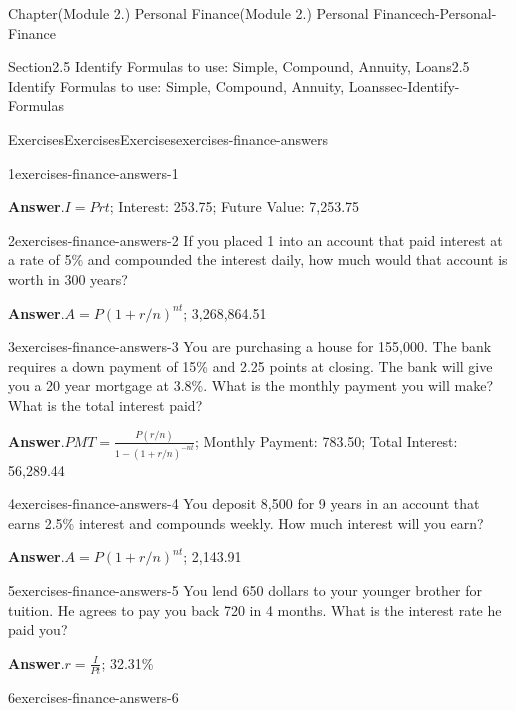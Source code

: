 \documentclass[oneside,10pt,]{book}
\newcommand{\blocktitlefont}{\relax}
\begin{document}
\begin{chapterptx}{Chapter}{(Module 2.) Personal Finance}{}{(Module 2.) Personal Finance}{}{}{ch-Personal-Finance}
\begin{sectionptx}{Section}{2.5 Identify Formulas to use: Simple, Compound, Annuity, Loans}{}{2.5 Identify Formulas to use: Simple, Compound, Annuity, Loans}{}{}{sec-Identify-Formulas}
\begin{exercises-subsection-numberless}{Exercises}{Exercises}{}{Exercises}{}{}{exercises-finance-answers}
\begin{divisionexercise}{1}{}{}{exercises-finance-answers-1}
\par\smallskip%
\noindent\textbf{\blocktitlefont Answer}.\hypertarget{exercises-finance-answers-1-2}{}\quad{}\(I = Prt\); Interest: \textdollar{}253.75; Future Value: \textdollar{}7,253.75%
\end{divisionexercise}%
\begin{divisionexercise}{2}{}{}{exercises-finance-answers-2}%
If you placed \textdollar{}1 into an account that paid interest at a rate of 5\% and compounded the interest daily, how much would that account is worth in 300 years?%
\par\smallskip%
\noindent\textbf{\blocktitlefont Answer}.\hypertarget{exercises-finance-answers-2-2}{}\quad{}\(A = P(1 + r/n)^{nt}\); \textdollar{}3,268,864.51%
\end{divisionexercise}%
\begin{divisionexercise}{3}{}{}{exercises-finance-answers-3}%
You are purchasing a house for \textdollar{}155,000. The bank requires a down payment of 15\% and 2.25 points at closing. The bank will give you a 20 year mortgage at 3.8\%. What is the monthly payment you will make? What is the total interest paid?%
\par\smallskip%
\noindent\textbf{\blocktitlefont Answer}.\hypertarget{exercises-finance-answers-3-2}{}\quad{}\(PMT = \frac{P(r/n)}{1-(1+r/n)^{-nt}}\); Monthly Payment: \textdollar{}783.50; Total Interest: \textdollar{}56,289.44%
\end{divisionexercise}%
\begin{divisionexercise}{4}{}{}{exercises-finance-answers-4}%
You deposit \textdollar{}8,500 for 9 years in an account that earns 2.5\% interest and compounds weekly. How much interest will you earn?%
\par\smallskip%
\noindent\textbf{\blocktitlefont Answer}.\hypertarget{exercises-finance-answers-4-2}{}\quad{}\(A = P(1 + r/n)^{nt}\); \textdollar{}2,143.91%
\end{divisionexercise}%
\begin{divisionexercise}{5}{}{}{exercises-finance-answers-5}%
You lend 650 dollars to your younger brother for tuition. He agrees to pay you back \textdollar{}720 in 4 months. What is the interest rate he paid you?%
\par\smallskip%
\noindent\textbf{\blocktitlefont Answer}.\hypertarget{exercises-finance-answers-5-2}{}\quad{}\(r = \frac{I}{Pt}\); 32.31\%%
\end{divisionexercise}%
\begin{divisionexercise}{6}{}{}{exercises-finance-answers-6}%

\end{divisionexercise}
\end{exercises-subsection-numberless}
\end{sectionptx}
\end{chapterptx}
\end{document}
